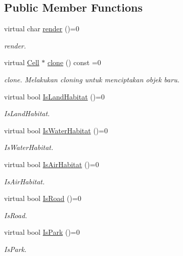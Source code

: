 \subsection*{Public Member Functions}
\begin{DoxyCompactItemize}
\item 
virtual char \hyperlink{classCell_a6415c339261b76ebc62867b19d788d3b}{render} ()=0
\begin{DoxyCompactList}\small\item\em render. \end{DoxyCompactList}\item 
virtual \hyperlink{classCell}{Cell} $\ast$ \hyperlink{classCell_aafd03896d9a6131f14273752f9fb9815}{clone} () const =0
\begin{DoxyCompactList}\small\item\em clone. Melakukan cloning untuk menciptakan objek baru. \end{DoxyCompactList}\item 
virtual bool \hyperlink{classCell_a6cc005c27ee600d76a91459b7733b90e}{Is\+Land\+Habitat} ()=0
\begin{DoxyCompactList}\small\item\em Is\+Land\+Habitat. \end{DoxyCompactList}\item 
virtual bool \hyperlink{classCell_af620aac2cb7ce59657ca158255462fef}{Is\+Water\+Habitat} ()=0
\begin{DoxyCompactList}\small\item\em Is\+Water\+Habitat. \end{DoxyCompactList}\item 
virtual bool \hyperlink{classCell_a24f8abceee9ce115d47b588992407a4d}{Is\+Air\+Habitat} ()=0
\begin{DoxyCompactList}\small\item\em Is\+Air\+Habitat. \end{DoxyCompactList}\item 
virtual bool \hyperlink{classCell_a6afd033fa34492761e1de9fd1f7c8a95}{Is\+Road} ()=0
\begin{DoxyCompactList}\small\item\em Is\+Road. \end{DoxyCompactList}\item 
virtual bool \hyperlink{classCell_ad87cbdb9c06b19c7c6571053c3888a51}{Is\+Park} ()=0
\begin{DoxyCompactList}\small\item\em Is\+Park. \end{DoxyCompactList}\item 

\end{DoxyCompactItemize}
